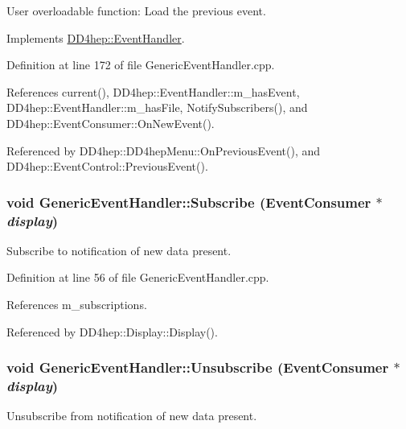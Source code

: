User overloadable function: Load the previous event. 

Implements \hyperlink{class_d_d4hep_1_1_event_handler_a0942608bebbdd107c9dedbdc7311791f}{DD4hep::EventHandler}.

Definition at line 172 of file GenericEventHandler.cpp.

References current(), DD4hep::EventHandler::m\_\-hasEvent, DD4hep::EventHandler::m\_\-hasFile, NotifySubscribers(), and DD4hep::EventConsumer::OnNewEvent().

Referenced by DD4hep::DD4hepMenu::OnPreviousEvent(), and DD4hep::EventControl::PreviousEvent().\hypertarget{class_d_d4hep_1_1_generic_event_handler_a8065b0b0f095783b7daf38ff19660cf7}{
\subsubsection[{Subscribe}]{\setlength{\rightskip}{0pt plus 5cm}void GenericEventHandler::Subscribe ({\bf EventConsumer} $\ast$ {\em display})}}
\label{class_d_d4hep_1_1_generic_event_handler_a8065b0b0f095783b7daf38ff19660cf7}


Subscribe to notification of new data present. 

Definition at line 56 of file GenericEventHandler.cpp.

References m\_\-subscriptions.

Referenced by DD4hep::Display::Display().\hypertarget{class_d_d4hep_1_1_generic_event_handler_a030cffac2446e410dba9dec87802e035}{
\subsubsection[{Unsubscribe}]{\setlength{\rightskip}{0pt plus 5cm}void GenericEventHandler::Unsubscribe ({\bf EventConsumer} $\ast$ {\em display})}}
\label{class_d_d4hep_1_1_generic_event_handler_a030cffac2446e410dba9dec87802e035}


Unsubscribe from notification of new data present. 

